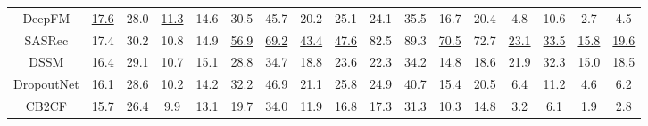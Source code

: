 \documentclass[sigconf]{acmart}
\begin{document}
\begin{table}[t]
{\begin{tabular}{c cccc cccc cccc cccc}
    DeepFM             & \underline{17.6}           & 28.0                       & \underline{11.3}            & 14.6                        & 30.5            & 45.7                      & 20.2            & 25.1                        & 24.1            & 35.5                        & 16.7            & 20.4                      & 4.8            & 10.6                       & 2.7            & 4.5         \\
    SASRec                & 17.4            & 30.2                         & 10.8            & 14.9                       & \underline{56.9}            & \underline{69.2}                        & \underline{43.4}            & \underline{47.6}                       & 82.5            & 89.3                     & \underline{70.5}            & 72.7                      & \underline{23.1}            & \underline{33.5}                     & \underline{15.8}            & \underline{19.6}          \\
    DSSM               & 16.4            & 29.1                    & 10.7           & 15.1                        & 28.8           & 34.7                      & 18.8            & 23.6                   & 22.3            & 34.2                       & 14.8            & 18.6                     & 21.9            & 32.3                      & 15.0           & 18.5 \\
    DropoutNet             & 16.1            & 28.6                        & 10.2            & 14.2                      & 32.2            & 46.9                       &  21.1           & 25.8                      & 24.9            & 40.7                      & 15.4            & 20.5                       & 6.4            & 11.2                      & 4.6            & 6.2          \\
    CB2CF                & 15.7            & 26.4                       & 9.9            & 13.1                  & 19.7            & 34.0                     & 11.9            & 16.8                      & 17.3            & 31.3                    & 10.3            & 14.8                 & 3.2           & 6.1                   & 1.9            & 2.8          \\

\end{tabular}}
\end{table}
\end{document}

